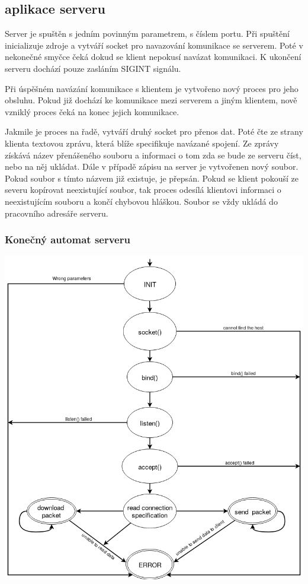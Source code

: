 \documentclass[a4paper, 12pt]{article}
\begin{document}
\subsection{aplikace serveru}
Server je spuštěn s jedním povinným parametrem, s číslem portu. Při spuštění inicializuje zdroje a vytváří socket pro navazování komunikace se serverem. Poté v nekonečné smyčce čeká dokud se klient nepokusí navázat komunikaci. K ukončení serveru dochází pouze zasláním SIGINT signálu.

Při úspěšném navázání komunikace s klientem je vytvořeno nový proces pro jeho obsluhu. Pokud již dochází ke komunikace mezi serverem a jiným klientem, nově vzniklý proces čeká na konec jejich komunikace.

Jakmile je proces na řadě, vytváří druhý socket pro přenos dat. Poté čte ze strany klienta textovou zprávu, která  blíže specifikuje navázané spojení. Ze zprávy získává  název přenášeného souboru a informaci o tom zda se bude ze serveru číst, nebo na něj ukládat.  Dále v případě  zápisu na server je vytvořenen nový soubor. Pokud soubor s tímto názvem již existuje, je přepsán. Pokud se klient pokouší ze severu kopírovat neexistující soubor, tak proces odesílá klientovi informaci o neexistujícím souboru a končí chybovou hláškou. Soubor se vždy ukládá do pracovního adresáře serveru.

\subsubsection{Konečný automat serveru}
\includegraphics[scale = 0.5]{IPK_FSMSERVER.png}
\end{document}
